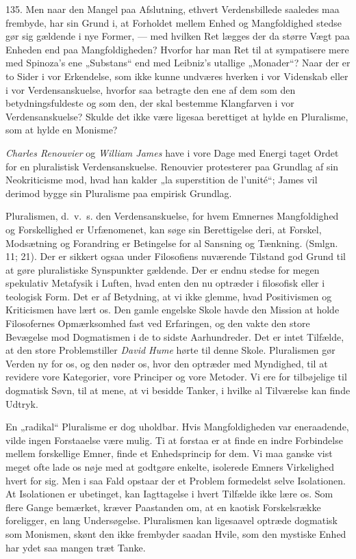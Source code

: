 \documentclass[12pt,a4paper]{book}
\newcommand{\apage}[1]{\marginnote{\footnotesize\textit{[#1]}}}
\begin{document}
135. Men naar den Mangel paa Afslutning, ethvert Verdensbillede saaledes maa frembyde, har
sin Grund i, at Forholdet mellem Enhed og Mangfoldighed stedse gør sig gældende i nye
Former, --- med hvilken Ret lægges der da større Vægt paa Enheden end paa
Mangfoldigheden? Hvorfor har man Ret til at sympatisere mere med Spinoza's ene „Substans“
end med Leibniz's utallige „Monader“? Naar der er to Sider i vor Erkendelse, som ikke
kunne undværes hverken i vor Videnskab eller i vor Verdensanskuelse, hvorfor saa betragte
den ene af dem som den betydningsfuldeste og som den, der skal bestemme Klangfarven i vor
Verdensanskuelse? Skulde det ikke være ligesaa berettiget at hylde en Pluralisme, som at
hylde en Monisme?

\emph{Charles Renouvier} og \emph{William James} have i vore Dage med Energi taget Ordet
for en pluralistisk Verdensanskuelse. Renouvier protesterer paa Grundlag af sin
Neokriticisme mod, hvad han kalder „la superstition de l'unité“; James vil derimod bygge
sin Pluralisme paa empirisk Grundlag.

Pluralismen, d.\ v.\ s. den Verdensanskuelse, for hvem Emnernes Mangfoldighed og
Forskellighed er Urfænomenet, kan søge sin Berettigelse deri, at Forskel, Modsætning og
Forandring er Betingelse for al Sansning og Tænkning. (Smlgn. 11; 21). Der er sikkert
ogsaa under Filosofiens nuværende Tilstand god Grund til at gøre pluralistiske
Synspunkter gældende. Der er endnu stedse for megen spekulativ Metafysik \apage{324} i Luften, hvad
enten den nu optræder i filosofisk eller i teologisk Form. Det er af Betydning, at vi
ikke glemme, hvad Positivismen og Kriticismen have lært os. Den gamle engelske Skole
havde den Mission at holde Filosofernes Opmærksomhed fast ved Erfaringen, og den vakte
den store Bevægelse mod Dogmatismen i de to sidste Aarhundreder. Det er intet Tilfælde,
at den store Problemstiller \emph{David Hume} hørte til denne Skole. Pluralismen gør
Verden ny for os, og den nøder os, hvor den optræder med Myndighed, til at revidere vore
Kategorier, vore Principer og vore Metoder. Vi ere for tilbøjelige til dogmatisk Søvn,
til at mene, at vi besidde Tanker, i hvilke al Tilværelse kan finde Udtryk.

En „radikal“ Pluralisme er dog uholdbar. Hvis Mangfoldigheden var eneraadende, vilde
ingen Forstaaelse være mulig. Ti at forstaa er at finde en indre Forbindelse mellem
forskellige Emner, finde et Enhedsprincip for dem. Vi maa ganske vist meget ofte lade os
nøje med at godtgøre enkelte, isolerede Emners Virkelighed hvert for sig. Men i saa Fald
opstaar der et Problem formedelst selve Isolationen. At Isolationen er ubetinget, kan
Iagttagelse i hvert Tilfælde ikke lære os. Som flere Gange bemærket, kræver Paastanden
om, at en kaotisk Forskelsrække foreligger, en lang Undersøgelse. Pluralismen kan
ligesaavel optræde dogmatisk som Monismen, skønt den ikke frembyder saadan Hvile, som den
mystiske Enhed har ydet saa mangen træt Tanke.
\end{document}
